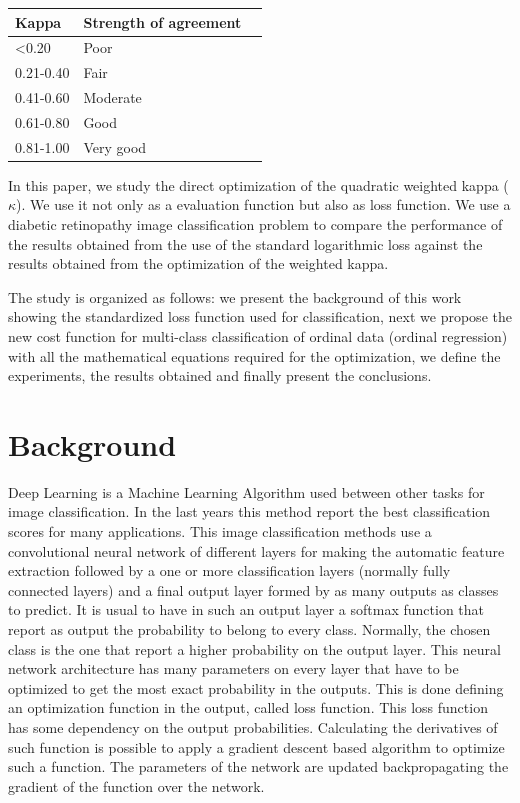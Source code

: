 \documentclass{IOS-Book-Article}
\begin{document}
\begin{center}
	\label{tab:kappa_int}
	\begin{tabular}{llr}
		\hline
		Kappa    & Strength of agreement \\
		\hline
		<0.20 		& Poor \\
		0.21-0.40 	& Fair \\
		0.41-0.60 	& Moderate \\
		0.61-0.80 	& Good \\
		0.81-1.00 	& Very good \\
		\hline
	\end{tabular}
\end{center}

In this paper, we study the direct optimization of the quadratic weighted kappa ($\kappa$). We use it not only as a evaluation function but also as loss function. We use a diabetic retinopathy image classification problem to compare the performance of the results obtained from the use of the standard logarithmic loss against the results obtained from the optimization of the weighted kappa.

The study is organized as follows: we present the background of this work showing the standardized loss function used for classification, next we propose the new cost function for multi-class classification of ordinal data (ordinal regression) with all the mathematical equations required for the optimization, we define the experiments, the results obtained and finally present the conclusions.

\section{Background}

Deep Learning is a Machine Learning Algorithm used between other tasks for image classification. In the last years this method report the best classification scores for many applications. This image classification methods use a convolutional neural network of different layers for making the automatic feature extraction followed by a one or more classification layers (normally fully connected layers) and a final output layer formed by as many outputs as classes to predict. It is usual to have in such an output layer a softmax function that report as output the probability to belong to every class. Normally, the chosen class is the one that report a higher probability on the output layer. This neural network architecture has many parameters on every layer that have to be optimized to get the most exact probability in the outputs. This is done defining an optimization function in the output, called loss function. This loss function has some dependency on the output probabilities. Calculating the derivatives of such function is possible to apply a gradient descent based algorithm to optimize such a function. The parameters of the network are updated backpropagating the gradient of the function over the network.
\end{document}
